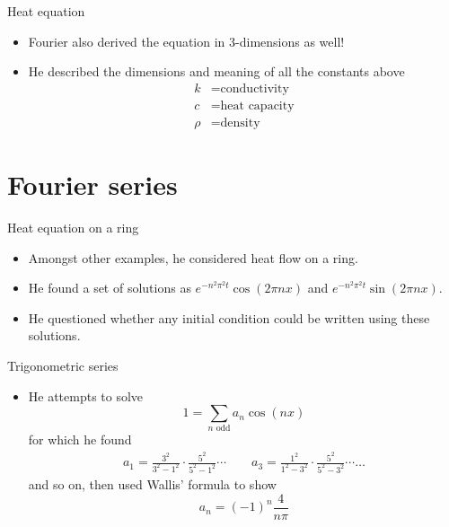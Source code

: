 \documentclass[aspectratio=169]{beamer}
\begin{document}
\begin{frame}{Heat equation}
\vfill
\begin{itemize}
    \pause
    \item Fourier also derived the equation in 3-dimensions as well!
    \pause
    \item He described the dimensions and meaning of all the constants above
    \begin{align*}
    k&= \textrm{conductivity}\\
    c&= \textrm{heat capacity}\\
    \rho&= \textrm{density}
    \end{align*}
\end{itemize}
\vfill
\end{frame}

\section{Fourier series}

\begin{frame}{Heat equation on a ring}
\vfill
\begin{itemize}
    \pause
    \item Amongst other examples, he considered heat flow on a ring.
    \pause
    \item He found a set of solutions as $e^{-n^2 \pi^2 t}\cos(2\pi n x)$ and $e^{-n^2 \pi^2 t}\sin(2\pi n x)$.
    \pause
    \item He questioned whether any initial condition could be written using these solutions.
\end{itemize}
\vfill
\end{frame}

\begin{frame}{Trigonometric series}
\vfill
\begin{itemize}
    \pause
    \item He attempts to solve
    \[
          1= \sum_{n \textrm{ odd}} a_{n} \cos(nx)
    \]
    for which he found
    \begin{align*}
    a_1 = \frac{3^2}{3^2-1^2}\cdot \frac{5^2}{5^2-1^2} \cdots \qquad a_3 = \frac{1^2}{1^2-3^2}\cdot \frac{5^2}{5^2-3^2} \cdots \dots
    \end{align*}
    and so on, then used Wallis' formula to show
    \[
    a_n = (-1)^n \frac{4}{n\pi}
    \]
\end{itemize}
\vfill
\end{frame}
\end{document}
